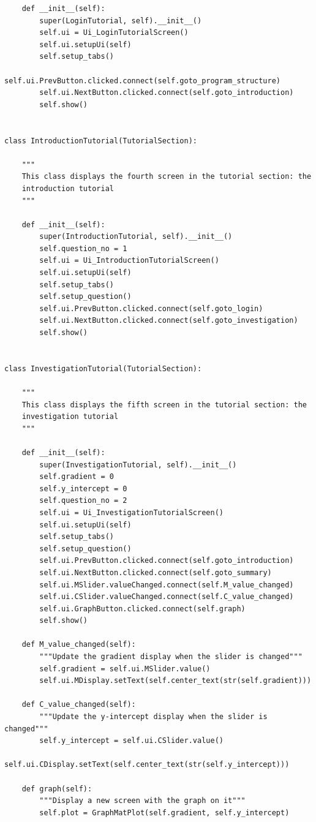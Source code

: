 \documentclass[12pt]{article}
\begin{document}
\begin{lstlisting}
    def __init__(self):
        super(LoginTutorial, self).__init__()
        self.ui = Ui_LoginTutorialScreen()
        self.ui.setupUi(self)
        self.setup_tabs()
        self.ui.PrevButton.clicked.connect(self.goto_program_structure)
        self.ui.NextButton.clicked.connect(self.goto_introduction)
        self.show()


class IntroductionTutorial(TutorialSection):

    """
    This class displays the fourth screen in the tutorial section: the
    introduction tutorial
    """

    def __init__(self):
        super(IntroductionTutorial, self).__init__()
        self.question_no = 1
        self.ui = Ui_IntroductionTutorialScreen()
        self.ui.setupUi(self)
        self.setup_tabs()
        self.setup_question()
        self.ui.PrevButton.clicked.connect(self.goto_login)
        self.ui.NextButton.clicked.connect(self.goto_investigation)
        self.show()


class InvestigationTutorial(TutorialSection):

    """
    This class displays the fifth screen in the tutorial section: the
    investigation tutorial
    """

    def __init__(self):
        super(InvestigationTutorial, self).__init__()
        self.gradient = 0
        self.y_intercept = 0
        self.question_no = 2
        self.ui = Ui_InvestigationTutorialScreen()
        self.ui.setupUi(self)
        self.setup_tabs()
        self.setup_question()
        self.ui.PrevButton.clicked.connect(self.goto_introduction)
        self.ui.NextButton.clicked.connect(self.goto_summary)
        self.ui.MSlider.valueChanged.connect(self.M_value_changed)
        self.ui.CSlider.valueChanged.connect(self.C_value_changed)
        self.ui.GraphButton.clicked.connect(self.graph)
        self.show()

    def M_value_changed(self):
        """Update the gradient display when the slider is changed"""
        self.gradient = self.ui.MSlider.value()
        self.ui.MDisplay.setText(self.center_text(str(self.gradient)))

    def C_value_changed(self):
        """Update the y-intercept display when the slider is changed"""
        self.y_intercept = self.ui.CSlider.value()
        self.ui.CDisplay.setText(self.center_text(str(self.y_intercept)))

    def graph(self):
        """Display a new screen with the graph on it"""
        self.plot = GraphMatPlot(self.gradient, self.y_intercept)



\end{lstlisting}
\end{document}
